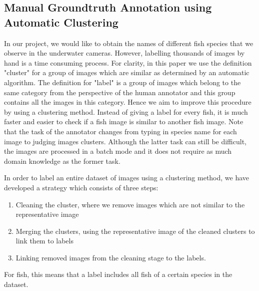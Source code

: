 \subsection{Manual Groundtruth Annotation using Automatic Clustering}
In our project, we would like to obtain the names of different fish species that we observe 
in the underwater cameras. However, labelling thousands of images by hand is a time consuming process.
For clarity, in this paper we use the definition "cluster" for a group of images which are similar as determined by an 
automatic algorithm. The definition for "label" is a group of images which belong to the same category from 
the perspective of the human annotator and this group contains all the images in this category.
Hence we aim to improve this procedure by using a clustering method. 
Instead of giving a label for every fish, it is much faster and easier 
to check if a fish image is similar to another fish image. 
Note that the task of the annotator changes from typing in species name for each image to judging images clusters. 
Although the latter task can still be difficult, the images are processed in a batch mode and it
does not require as much domain knowledge as the former task.


In order to label an entire dataset of images using a clustering method, we have developed a strategy which
consists of three steps:
\begin{enumerate}
 \item  Cleaning the cluster, where we remove images which are not similar to the representative image
 \item  Merging the clusters, using the representative image of the cleaned clusters to link them to labels
 \item  Linking removed images from the cleaning stage to the labels. 
\end{enumerate}
 For fish, this means that a label includes all fish
of a certain species in the dataset.

